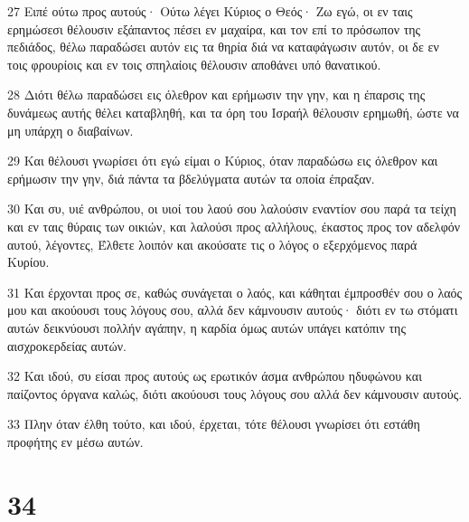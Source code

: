 \par 27 Ειπέ ούτω προς αυτούς· Ούτω λέγει Κύριος ο Θεός· Ζω εγώ, οι εν ταις ερημώσεσι θέλουσιν εξάπαντος πέσει εν μαχαίρα, και τον επί το πρόσωπον της πεδιάδος, θέλω παραδώσει αυτόν εις τα θηρία διά να καταφάγωσιν αυτόν, οι δε εν τοις φρουρίοις και εν τοις σπηλαίοις θέλουσιν αποθάνει υπό θανατικού.
\par 28 Διότι θέλω παραδώσει εις όλεθρον και ερήμωσιν την γην, και η έπαρσις της δυνάμεως αυτής θέλει καταβληθή, και τα όρη του Ισραήλ θέλουσιν ερημωθή, ώστε να μη υπάρχη ο διαβαίνων.
\par 29 Και θέλουσι γνωρίσει ότι εγώ είμαι ο Κύριος, όταν παραδώσω εις όλεθρον και ερήμωσιν την γην, διά πάντα τα βδελύγματα αυτών τα οποία έπραξαν.
\par 30 Και συ, υιέ ανθρώπου, οι υιοί του λαού σου λαλούσιν εναντίον σου παρά τα τείχη και εν ταις θύραις των οικιών, και λαλούσι προς αλλήλους, έκαστος προς τον αδελφόν αυτού, λέγοντες, Έλθετε λοιπόν και ακούσατε τις ο λόγος ο εξερχόμενος παρά Κυρίου.
\par 31 Και έρχονται προς σε, καθώς συνάγεται ο λαός, και κάθηται έμπροσθέν σου ο λαός μου και ακούουσι τους λόγους σου, αλλά δεν κάμνουσιν αυτούς· διότι εν τω στόματι αυτών δεικνύουσι πολλήν αγάπην, η καρδία όμως αυτών υπάγει κατόπιν της αισχροκερδείας αυτών.
\par 32 Και ιδού, συ είσαι προς αυτούς ως ερωτικόν άσμα ανθρώπου ηδυφώνου και παίζοντος όργανα καλώς, διότι ακούουσι τους λόγους σου αλλά δεν κάμνουσιν αυτούς.
\par 33 Πλην όταν έλθη τούτο, και ιδού, έρχεται, τότε θέλουσι γνωρίσει ότι εστάθη προφήτης εν μέσω αυτών.

\chapter{34}

